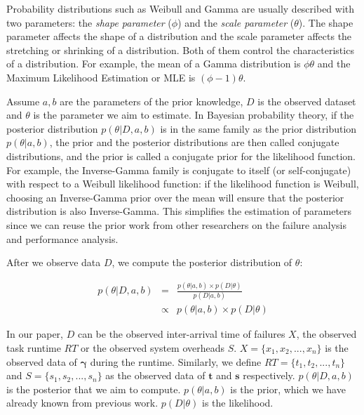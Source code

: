 \documentclass{IOS-Book-Article}
\begin{document}
Probability distributions such as Weibull and Gamma are usually described with two parameters: the \emph{shape parameter} ($\phi$) and the \emph{scale parameter} ($\theta$). The shape parameter affects the shape of a distribution and the scale parameter affects the stretching or shrinking of a distribution. Both of them control the characteristics of a distribution. For example, the mean of a Gamma distribution is $\phi\theta$ and the Maximum Likelihood Estimation or MLE is $(\phi-1)\theta$. 

Assume $a,b$ are the parameters of the prior knowledge, $D$ is the observed dataset and $\theta$ is the parameter we aim to estimate. In Bayesian probability theory, if the posterior distribution $p(\theta|D, a, b)$ is in the same family as the prior distribution $p(\theta|a, b)$, the prior and the posterior distributions are then called conjugate distributions, and the prior is called a conjugate prior for the likelihood function. For example, the Inverse-Gamma family is conjugate to itself (or self-conjugate) with respect to a Weibull likelihood function: if the likelihood function is Weibull, choosing an Inverse-Gamma prior over the mean will ensure that the posterior distribution is also Inverse-Gamma. This simplifies the estimation of parameters since we can reuse the prior work from other researchers \cite{Schroeder2006, Iosup2008, Sun2003, Chen2011} on the failure analysis and performance analysis. 

After we observe data $D$, we compute the posterior distribution of $\theta$:

\begin{eqnarray}
	\displaystyle  
	p(\theta|D, a, b)&=&\frac{p(\theta|a, b)\times p(D|\theta)}{p(D|a, b)}\nonumber  \\
	&\propto&p(\theta|a, b)\times p(D|\theta)\nonumber 
\end{eqnarray}

In our paper, $D$ can be the observed inter-arrival time of failures $X$, the observed task runtime $RT$ or the observed system overheads $S$. 
$X=\{x_1, x_2, ..., x_n\}$ is the observed data of $\bm\gamma$ during the runtime. Similarly, we define $RT=\{t_1, t_2, ..., t_n\}$ and $S=\{s_1, s_2, ..., s_n\}$ as the observed data of $\bm t$ and $\bm s$ respectively. $p(\theta|D,a, b)$ is the posterior that we aim to compute. $p(\theta|a, b)$ is the prior, which we have already known from previous work. $p(D|\theta)$ is the likelihood. 
\end{document}
